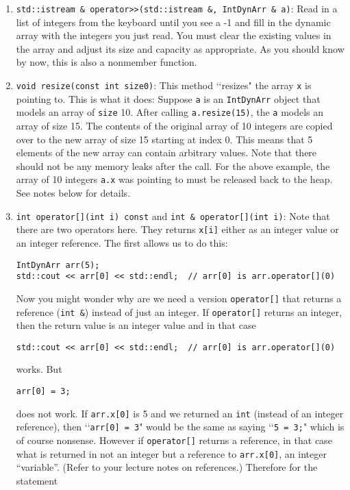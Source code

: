\begin{enumerate}
\item \verb!std::istream & operator>>(std::istream &, IntDynArr & a)!: 
Read in a list of integers from the keyboard until you see a -1 and 
fill in the dynamic array with the integers you just read. You must clear 
the existing values in the array and adjust its size and capacity as 
appropriate. As you should know by now, this is also a nonmember function. 

\item \verb!void resize(const int size0)!: This method \lq\lq resizes" the 
array \verb!x! is pointing to. This is what it does: Suppose \verb!a! is an 
\verb!IntDynArr! object that models an array of \verb!size! 10. After 
calling \verb!a.resize(15)!, the \verb!a! models an array of size 15. The 
contents of the original array of 10 integers are copied over to the 
new array of size 15 starting at index 0. This means that 5 elements of 
the new array can contain arbitrary values. Note that there should not be 
any memory leaks after the call. For the above example, the array of 10 
integers \verb!a.x! was pointing to must be released back to the heap. See notes 
below for details.

\item \verb!int operator[](int i) const! and \verb!int & operator[](int i)!:
Note that there are two operators here. They returns \verb!x[i]! either as an 
integer value or an integer reference. The first allows us to do this:

\begin{Verbatim}[frame=single]
IntDynArr arr(5);
std::cout << arr[0] << std::endl;  // arr[0] is arr.operator[](0)
\end{Verbatim}

Now you might wonder why are we need a version \verb!operator[]! that 
returns a reference (\verb!int &!) instead of just an integer. If 
\verb!operator[]! returns an integer, then the return value is an 
integer value and in that case

\begin{Verbatim}[frame=single]
std::cout << arr[0] << std::endl;  // arr[0] is arr.operator[](0)
\end{Verbatim}

works. But

\begin{Verbatim}[frame=single]
arr[0] = 3;
\end{Verbatim}

does not work. If \verb!arr.x[0]! is 5 and we returned an \verb!int! 
(instead of an integer reference), then \lq\lq \verb!arr[0] = 3!" would 
be the same as saying \lq\lq \verb!5 = 3;!" which is of course nonsense. 
However if \verb!operator[]! returns a reference, in that case what is 
returned in not an integer but a reference to \verb!arr.x[0]!, an integer 
“variable”. (Refer to your lecture notes on references.) Therefore for the 
statement


\end{enumerate}
